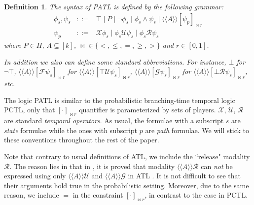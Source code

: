 \documentclass[times, 10 pt,twocolumn]{article}
\newtheorem{definition}[theorem]{Definition}{\bfseries}{\rm}
\newcommand{\mc}[1]{\mathcal{#1}}
\newcommand{\lla}{\langle\langle}
\newcommand{\rra}{\rangle\rangle}
\begin{document}
\begin{definition} The syntax of \emph{PATL} is defined by the
following grammar:
\begin{eqnarray*}
  \phi_s, \psi_s & ::= & \top \mid P\mid \neg \phi_s\mid
  \phi_s \wedge \psi_s \mid \lla A\rra [\psi_p]_{\bowtie r}\\
  \psi_p & ::= & \mc{X}\phi_s\mid \phi_s\mc{U}\psi_s \mid  \phi_s\mc{R}\psi_s
\end{eqnarray*}
where $P\in \Pi$, $A\subseteq [k]$, $\bowtie \in\{<, \leq, =,
\geq, >\}$ and $r\in [0,1]$.

In addition we also can define some standard abbreviations. %
For instance, $\bot$ for $\neg \top$, $\lla A\rra
[\mc{F}\psi_s]_{\bowtie r}$ for $\lla A\rra
[\top\mc{U}\psi_s]_{\bowtie r}$, $\lla A\rra
[\mc{G}\psi_s]_{\bowtie r}$ for $\lla A\rra
[\bot\mc{R}\psi_s]_{\bowtie r}$, etc.
\end{definition}

The logic PATL is similar to the probabilistic branching-time
temporal logic PCTL, only that $[\cdot]_{\bowtie r}$ quantifier is
parameterized by sets of players. $\mc{X}$, $\mc{U}$, $\mc{R}$ are
standard \emph{temporal operators}. As usual, the formulae with a
subscript $s$ are \emph{state} formulae while the ones with
subscript $p$ are \emph{path} formulae. We will stick to these
conventions throughout the rest of the paper.



Note that contrary to usual definitions of ATL, we include the
``release" modality $\mc{R}$. The reason lies in that in
\cite{LMO07}, it is proved that modality $\lla A\rra\mc{R}$ can
\emph{not} be expressed using only $\lla A\rra\mc{U}$ and $\lla
A\rra\mc{G}$ in ATL \cite{AHK02}. It is not difficult to see that
their arguments hold true in the probabilistic setting. Moreover,
due to the same reason, we include $=$ in the constraint
$[\cdot]_{\bowtie r}$, in contrast to the case in PCTL.
%
\end{document}
